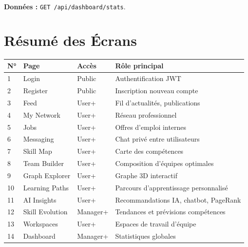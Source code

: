 \documentclass[12pt,a4paper]{article}
\begin{document}
\textbf{Données :} \texttt{GET /api/dashboard/stats}.

\section{Résumé des Écrans}

\begin{tabular}{|p{0.8cm}|p{4cm}|p{2.5cm}|p{6cm}|}
\hline
\textbf{N°} & \textbf{Page} & \textbf{Accès} & \textbf{Rôle principal} \\
\hline
1 & Login & Public & Authentification JWT \\
\hline
2 & Register & Public & Inscription nouveau compte \\
\hline
3 & Feed & User+ & Fil d'actualités, publications \\
\hline
4 & My Network & User+ & Réseau professionnel \\
\hline
5 & Jobs & User+ & Offres d'emploi internes \\
\hline
6 & Messaging & User+ & Chat privé entre utilisateurs \\
\hline
7 & Skill Map & User+ & Carte des compétences \\
\hline
8 & Team Builder & User+ & Composition d'équipes optimales \\
\hline
9 & Graph Explorer & User+ & Graphe 3D interactif \\
\hline
10 & Learning Paths & User+ & Parcours d'apprentissage personnalisé \\
\hline
11 & AI Insights & User+ & Recommandations IA, chatbot, PageRank \\
\hline
12 & Skill Evolution & Manager+ & Tendances et prévisions compétences \\
\hline
13 & Workspaces & User+ & Espaces de travail d'équipe \\
\hline
14 & Dashboard & Manager+ & Statistiques globales \\
\hline
\end{tabular}
\end{document}
